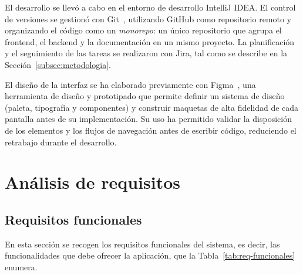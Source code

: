 \documentclass[12pt,a4paper,twoside,openright]{book}
\begin{document}
    El desarrollo se llevó a cabo en el entorno de desarrollo IntelliJ IDEA. El
    control de versiones se gestionó con Git~\cite{git}, utilizando GitHub como
    repositorio remoto y organizando el código como un \textit{monorepo}: un
    único repositorio que agrupa el frontend, el backend y la documentación en un
    mismo proyecto. La planificación y el seguimiento de las tareas se realizaron
    con Jira, tal como se describe en la Sección~\ref{subsec:metodologia}.

    El diseño de la interfaz se ha elaborado previamente con Figma~\cite{figma}, una
    herramienta de diseño y prototipado que permite definir un sistema de
    diseño (paleta, tipografía y componentes) y construir maquetas de alta
    fidelidad de cada pantalla antes de su implementación. Su uso ha permitido
    validar la disposición de los elementos y los flujos de navegación antes de
    escribir código, reduciendo el retrabajo durante el desarrollo.




    \chapter{Análisis de requisitos}
    \label{cap:analisis}


    
    \section{Requisitos funcionales}
    En esta sección se recogen los requisitos funcionales del sistema, es decir,
    las funcionalidades que debe ofrecer la aplicación, que la Tabla~\ref{tab:req-funcionales} 
    enumera.
    
\end{document}
